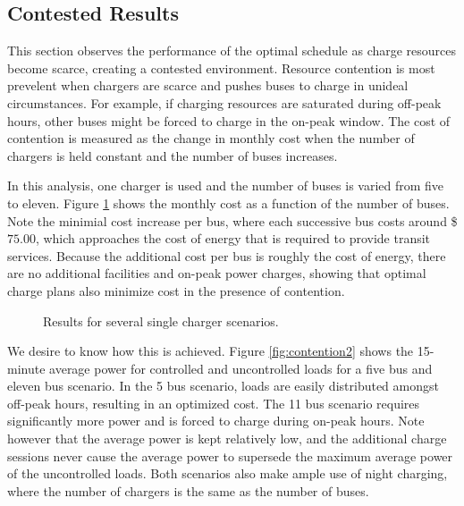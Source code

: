 \subsection{Contested Results}
This section observes the performance of the optimal schedule as charge resources become scarce, creating a contested environment. Resource contention is most prevelent when chargers are scarce and pushes buses to charge in unideal circumstances.  For example, if charging resources are saturated during off-peak hours, other buses might be forced to charge in the on-peak window. The cost of contention is measured as the change in monthly cost when the number of chargers is held constant and the number of buses increases. 
\par In this analysis, one charger is used and the number of buses is varied from five to eleven. Figure \ref{fig:contention1} shows the monthly cost as a function of the number of buses. Note the minimial cost increase per bus, where each successive bus costs around \$$75.00$, which approaches the cost of energy that is required to provide transit services.  Because the additional cost per bus is roughly the cost of energy, there are no additional facilities and on-peak power charges, showing that optimal charge plans also minimize cost in the presence of contention.
\begin{figure}
	\caption{Results for several single charger scenarios.}
	\label{fig:contention1}
\end{figure}
\par We desire to know how this is achieved. Figure \ref{fig:contention2} shows the 15-minute average power for controlled and uncontrolled loads for a five bus and eleven bus scenario. In the 5 bus scenario, loads are easily distributed amongst off-peak hours, resulting in an optimized cost.  The 11 bus scenario requires significantly more power and is forced to charge during on-peak hours.  Note however that the average power is kept relatively low, and the additional charge sessions never cause the average power to supersede the maximum average power of the uncontrolled loads. Both scenarios also make ample use of night charging, where the number of chargers is the same as the number of buses.  
\begin{figure*}
	\centering
	\caption{Comparison of the loads for a 5 and 11 bus scenario with one overhead charger} 
	\label{fig:contention2}
\end{figure*}

